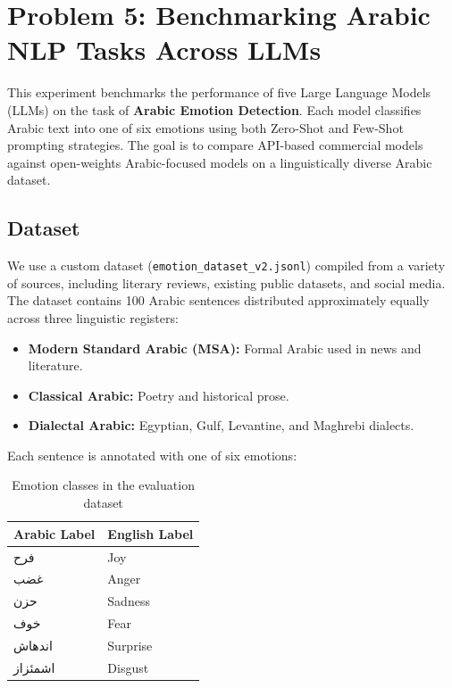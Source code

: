 \section{Problem 5: Benchmarking Arabic NLP Tasks Across LLMs}

This experiment benchmarks the performance of five Large Language Models (LLMs) on the task of \textbf{Arabic Emotion Detection}. Each model classifies Arabic text into one of six emotions using both Zero-Shot and Few-Shot prompting strategies. The goal is to compare API-based commercial models against open-weights Arabic-focused models on a linguistically diverse Arabic dataset.

\subsection{Dataset}

We use a custom dataset (\texttt{emotion\_dataset\_v2.jsonl}) compiled from a variety of sources, including literary reviews, existing public datasets, and social media. The dataset contains 100 Arabic sentences distributed approximately equally across three linguistic registers:

\begin{itemize}
    \item \textbf{Modern Standard Arabic (MSA):} Formal Arabic used in news and literature.
    \item \textbf{Classical Arabic:} Poetry and historical prose.
    \item \textbf{Dialectal Arabic:} Egyptian, Gulf, Levantine, and Maghrebi dialects.
\end{itemize}

Each sentence is annotated with one of six emotions:

\begin{table}[H]
    \centering
    \caption{Emotion classes in the evaluation dataset}
    \label{tab:emotions}
    \begin{tabular}{|l|l|}
        \hline
        \textbf{Arabic Label} & \textbf{English Label} \\
        \hline
        \textarabic{فرح} & Joy \\
        \textarabic{غضب} & Anger \\
        \textarabic{حزن} & Sadness \\
        \textarabic{خوف} & Fear \\
        \textarabic{اندهاش} & Surprise \\
        \textarabic{اشمئزاز} & Disgust \\
        \hline
    \end{tabular}
\end{table}

